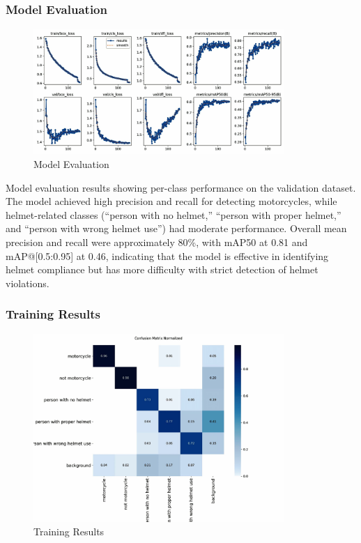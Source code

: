 \begin{refsection}
\subsubsection{Model Evaluation}
\begin{figure}[ht]
    \centering
	\includegraphics[width=0.85\textwidth]{figures/Fig 14.jpg}
	\caption[Model Evaluation]{Model Evaluation}
	\label{fig:model_evaluation}
\end{figure}

\noindent
Model evaluation results showing per-class performance on the validation dataset. The model achieved high precision and recall for detecting motorcycles, while helmet-related classes (“person with no helmet,” “person with proper helmet,” and “person with wrong helmet use”) had moderate performance. Overall mean precision and recall were approximately 80\%, with mAP50 at 0.81 and mAP@[0.5:0.95] at 0.46, indicating that the model is effective in identifying helmet compliance but has more difficulty with strict detection of helmet violations.

\subsubsection{Training Results}
\begin{figure}[ht]
    \centering
	\includegraphics[width=0.85\textwidth]{figures/Fig 15.jpg}
	\caption[Training Results]{Training Results}
	\label{fig:training_results}
\end{figure}


\end{refsection}
